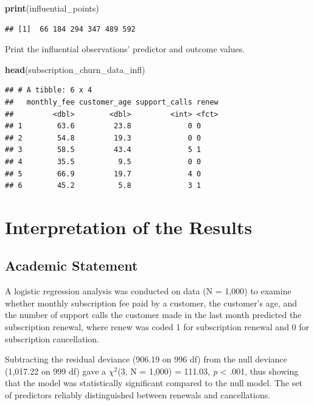 \documentclass[
]{article}
\newenvironment{Shaded}{\begin{snugshade}}{\end{snugshade}}
\newcommand{\FunctionTok}[1]{\textcolor[rgb]{0.13,0.29,0.53}{\textbf{#1}}}
\newcommand{\NormalTok}[1]{#1}
\begin{document}
\begin{Shaded}
\begin{Highlighting}[]
\FunctionTok{print}\NormalTok{(influential\_points)}
\end{Highlighting}
\end{Shaded}

\begin{verbatim}
## [1]  66 184 294 347 489 592
\end{verbatim}

Print the influential observations' predictor and outcome values.

\begin{Shaded}
\begin{Highlighting}[]
\FunctionTok{head}\NormalTok{(subscription\_churn\_data\_infl)}
\end{Highlighting}
\end{Shaded}

\begin{verbatim}
## # A tibble: 6 x 4
##   monthly_fee customer_age support_calls renew
##         <dbl>        <dbl>         <int> <fct>
## 1        63.6         23.8             0 0    
## 2        54.8         19.3             0 0    
## 3        58.5         43.4             5 1    
## 4        35.5          9.5             0 0    
## 5        66.9         19.7             4 0    
## 6        45.2          5.8             3 1
\end{verbatim}

\section{Interpretation of the
Results}\label{interpretation-of-the-results}

\subsection{Academic Statement}\label{academic-statement}

A logistic regression analysis was conducted on data (N = 1,000) to
examine whether monthly subscription fee paid by a customer, the
customer's age, and the number of support calls the customer made in the
last month predicted the subscription renewal, where renew was coded 1
for subscription renewal and 0 for subscription cancellation.

Subtracting the residual deviance (906.19 on 996 df) from the null
deviance (1,017.22 on 999 df) gave a \(\chi^2\)(3, N = 1,000) = 111.03,
\emph{p} \textless{} .001, thus showing that the model was statistically
significant compared to the null model. The set of predictors reliably
distinguished between renewals and cancellations.
\end{document}
